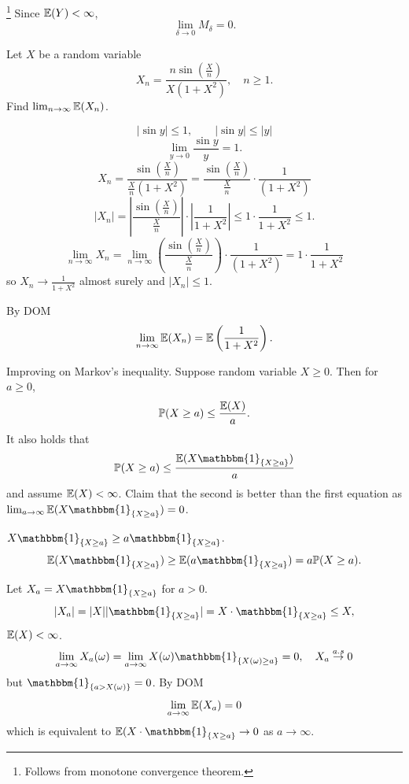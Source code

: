 \documentclass[10pt, a4paper]{article}
\begin{document}
\begin{lemma}\footnote{Follows from monotone convergence theorem.}
    Since $\mathbb{E}(Y) < \infty$,
    \[
    \lim_{\delta \to 0}M_{\delta} = 0.
    \]
\end{lemma}

\begin{example}
    Let $X$ be a random variable
    \[
    X_n = \frac{n\sin\left(\frac{X}{n}\right)}{X(1 + X ^ 2)},\quad n \geq 1.
    \]
    Find $\lim_{n \to \infty}\mathbb{E}(X_n)$.

    \begin{solution}
        \[
        |\sin{y}| \leq 1,\qquad |\sin{y}| \leq |y|
        \]
        \[
        \lim_{y \to 0}\frac{\sin{y}}{y} = 1.
        \]
        \[
        X_n = \frac{\sin\left(\frac{X}{n}\right)}{\frac{X}{n}(1 + X ^ 2)} = \frac{\sin\left(\frac{X}{n}\right)}{\frac{X}{n}}\cdot\frac{1}{(1 + X ^ 2)}
        \]
        \[
        |X_n| = \left|\frac{\sin\left(\frac{X}{n}\right)}{\frac{X}{n}}\right| \cdot \left|\frac{1}{1 + X ^ 2}\right| \leq 1 \cdot \frac{1}{1 + X ^ 2} \leq 1.
        \]
        \[
        \lim_{n \to \infty}X_n = \lim_{n \to \infty}\left(\frac{\sin\left(\frac{X}{n}\right)}{\frac{X}{n}}\right)\cdot\frac{1}{(1 + X ^ 2)} = 1 \cdot \frac{1}{1 + X ^ 2}
        \]
        so $X_n \to \frac{1}{1 + X ^ 2}$ almost surely and $|X_n| \leq 1$.

        By DOM
        \[
        \lim_{n \to \infty}\mathbb{E}(X_n) = \mathbb{E}\left(\frac{1}{1 + X ^ 2}\right).
        \]
    \end{solution}
\end{example}

\begin{example}
    Improving on Markov's inequality.
    Suppose random variable $X \geq 0$.
    Then for $a \geq 0$,
    \[
    \mathbb{P}(X \geq a) \leq \frac{\mathbb{E}(X)}{a}.
    \]
    It also holds that
    \[
    \P(X \geq a) \leq \frac{\E(X\mathbbm{1}_{\{X \geq a\}})}{a}
    \]
    and assume $\mathbb{E}(X) < \infty$.
    Claim that the second is better than the first equation as $\lim_{a \to \infty}\E(X\mathbbm{1}_{\{X \geq a\}}) = 0$.

    \begin{solution}
        $X\mathbbm{1}_{\{X \geq a\}} \geq a \mathbbm{1}_{\{X \geq a\}}$.
        \[
        \E(X\mathbbm{1}_{\{X \geq a\}}) \geq \E(a\mathbbm{1}_{\{X \geq a\}}) = a\P(X \geq a).
        \]

        Let $X_a = X\mathbbm{1}_{\{X \geq a\}}$ for $a > 0$.
        \[
        |X_a| = |X||\mathbbm{1}_{\{X \geq a\}}| = X\cdot\mathbbm{1}_{\{X \geq a\}} \leq X,
        \]
        $\mathbb{E}(X) < \infty$.
        \[
        \lim_{a \to \infty}X_a(\omega) = \lim_{a \to \infty}X(\omega)\mathbbm{1}_{\{X(\omega) \geq a\}} = 0,\quad X_a \overset{a.s}{\to} 0
        \]
        but $\mathbbm{1}_{\{a > X(\omega)\}} = 0$.
        By DOM
        \[
        \lim_{a \to \infty}\mathbb{E}(X_a) = 0
        \]
        which is equivalent to $\E(X\cdot\mathbbm{1}_{\{X \geq a\}} \to 0$ as $a \to \infty$.
    \end{solution}
\end{example}
\end{document}
